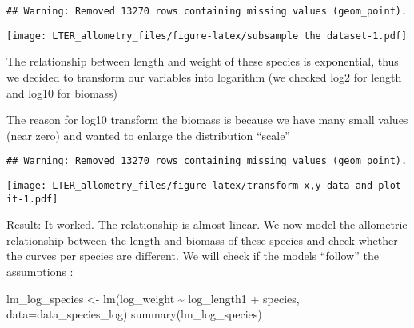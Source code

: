 \documentclass[
]{article}
\newenvironment{Shaded}{\begin{snugshade}}{\end{snugshade}}
\newcommand{\AttributeTok}[1]{\textcolor[rgb]{0.77,0.63,0.00}{#1}}
\newcommand{\FunctionTok}[1]{\textcolor[rgb]{0.00,0.00,0.00}{#1}}
\newcommand{\NormalTok}[1]{#1}
\newcommand{\OtherTok}[1]{\textcolor[rgb]{0.56,0.35,0.01}{#1}}
\newcommand{\SpecialCharTok}[1]{\textcolor[rgb]{0.00,0.00,0.00}{#1}}
\begin{document}
\begin{verbatim}
## Warning: Removed 13270 rows containing missing values (geom_point).
\end{verbatim}

\texttt{[image: LTER\_allometry\_files/figure-latex/subsample the dataset-1.pdf]}

The relationship between length and weight of these species is
exponential, thus we decided to transform our variables into logarithm
(we checked log2 for length and log10 for biomass)

The reason for log10 transform the biomass is because we have many small
values (near zero) and wanted to enlarge the distribution ``scale''

\begin{Shaded}
\end{Shaded}

\begin{verbatim}
## Warning: Removed 13270 rows containing missing values (geom_point).
\end{verbatim}

\texttt{[image: LTER\_allometry\_files/figure-latex/transform x,y data and plot it-1.pdf]}

Result: It worked. The relationship is almost linear. We now model the
allometric relationship between the length and biomass of these species
and check whether the curves per species are different. We will check if
the models ``follow'' the assumptions :

\begin{Shaded}
\begin{Highlighting}[]
\NormalTok{lm\_log\_species }\OtherTok{\textless{}{-}} \FunctionTok{lm}\NormalTok{(log\_weight }\SpecialCharTok{\textasciitilde{}}\NormalTok{ log\_length1 }\SpecialCharTok{+}\NormalTok{ species, }\AttributeTok{data=}\NormalTok{data\_species\_log)}
\FunctionTok{summary}\NormalTok{(lm\_log\_species)}
\end{Highlighting}
\end{Shaded}
\end{document}
